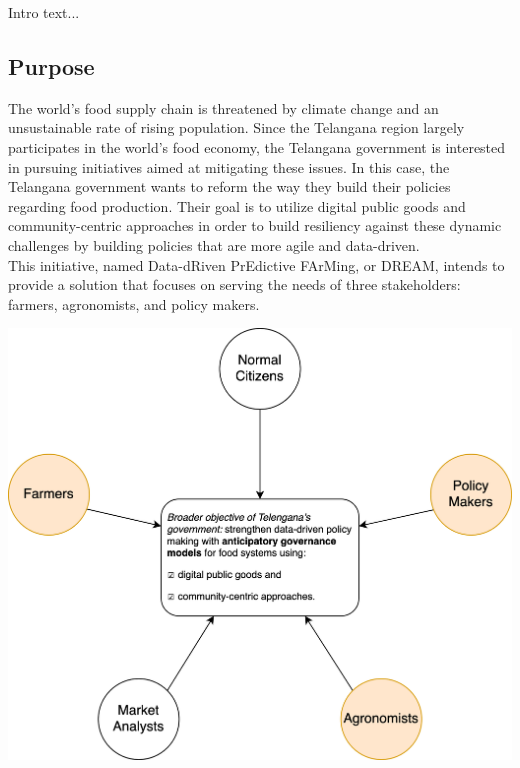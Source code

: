 \setcounter{goals_counter}{1}


Intro text...

\subsection{Purpose}
\begin{flushleft}
The world's food supply chain is threatened by climate change and an unsustainable rate of rising population. Since the Telangana region largely participates in the world's food economy, the Telangana government is interested in pursuing initiatives aimed at mitigating these issues. In this case, the Telangana government wants to reform the way they build their policies regarding food production. Their goal is to utilize digital public goods and community-centric approaches in order to build resiliency against these dynamic challenges by building policies that are more agile and data-driven. 
\smallskip\\
This initiative, named Data-dRiven PrEdictive FArMing, or DREAM, intends to provide a solution that focuses on serving the needs of three stakeholders: farmers, agronomists, and policy makers.  %
\begin{center}
\includegraphics[scale=0.6]{../images_diagrams/stakeholders_in_broader_gov_objective.png}
\end{center}

\end{flushleft}
